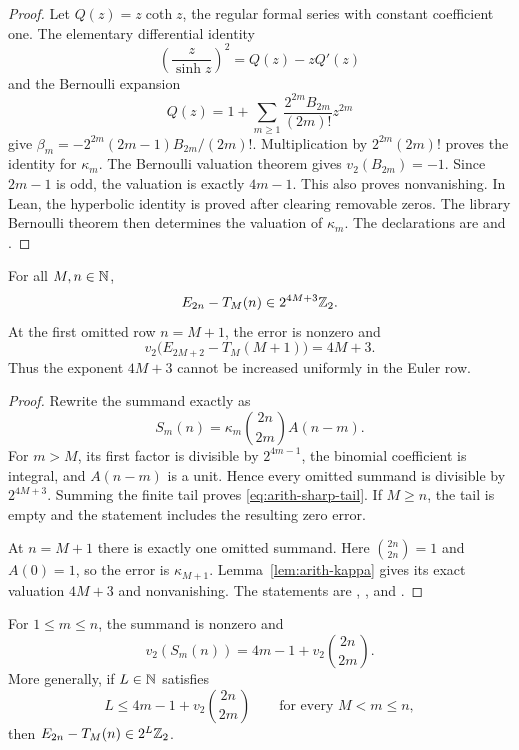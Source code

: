 \begin{proof}
Let $Q(z)=z\coth z$, the regular formal series with constant coefficient
one.  The elementary differential identity
\[
 \left(\frac z{\sinh z}\right)^2=Q(z)-zQ'(z)
\]
and the Bernoulli expansion
\[
 Q(z)=1+\sum_{m\ge1}\frac{2^{2m}B_{2m}}{(2m)!}z^{2m}
\]
give
$\beta_m=-2^{2m}(2m-1)B_{2m}/(2m)!$.
Multiplication by $2^{2m}(2m)!$ proves the identity for $\kappa_m$.
The Bernoulli valuation theorem gives $v_2(B_{2m})=-1$.
Since $2m-1$ is odd, the valuation is exactly $4m-1$.
This also proves nonvanishing.  In Lean, the hyperbolic identity is proved
after clearing removable zeros.  The library Bernoulli theorem then
determines the valuation of $\kappa_m$.
The declarations are
 and
.
\end{proof}

\begin{theorem}\label{thm:arith-sharp-tower}
For all $M,n\in\mathbb N$,
\begin{equation}\label{eq:arith-sharp-tail}
 E_{2n}-T_M(n)\in2^{4M+3}\mathbb Z_2.
\end{equation}
At the first omitted row $n=M+1$, the error is nonzero and
\[
 v_2\bigl(E_{2M+2}-T_M(M+1)\bigr)=4M+3.
\]
Thus the exponent $4M+3$ cannot be increased uniformly in the Euler row.
\end{theorem}

\begin{proof}
Rewrite the summand exactly as
\[
 S_m(n)=\kappa_m\binom{2n}{2m}A(n-m).
\]
For $m>M$, its first factor is divisible by $2^{4m-1}$, the binomial
coefficient is integral, and $A(n-m)$ is a unit.  Hence every omitted
summand is divisible by $2^{4M+3}$.  Summing the finite tail proves
\eqref{eq:arith-sharp-tail}.  If $M\ge n$, the tail is empty and the
statement includes the resulting zero error.

At $n=M+1$ there is exactly one omitted summand.  Here
$\binom{2n}{2n}=1$ and $A(0)=1$, so the error is $\kappa_{M+1}$.
Lemma~\ref{lem:arith-kappa} gives its exact valuation $4M+3$ and
nonvanishing.  The statements are
,
, and
.
\end{proof}

\begin{proposition}\label{prop:arith-row-weight}
For $1\le m\le n$, the summand is nonzero and
\[
 v_2(S_m(n))=4m-1+v_2\binom{2n}{2m}.
\]
More generally, if $L\in\mathbb N$ satisfies
\[
 L\le4m-1+v_2\binom{2n}{2m}\qquad\text{for every }M<m\le n,
\]
then $E_{2n}-T_M(n)\in2^L\mathbb Z_2$.
\end{proposition}

